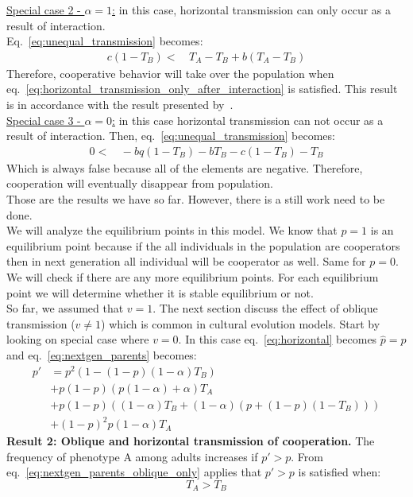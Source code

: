 \documentclass[12pt]{extarticle}
\begin{document}
\underline{Special case 2 - $\alpha =1$:} in this case, horizontal transmission can only occur as a result of interaction.
\\Eq.~\ref{eq:unequal_transmission} becomes:
\begin{equation} 
\begin{split} \label{eq:horizontal_transmission_only_after_interaction}
c(1-T_B)  < & \, T_A -T_B +b(T_A-T_B)
\end{split}
\end{equation}
Therefore, cooperative behavior will take over the population when eq.~\ref{eq:horizontal_transmission_only_after_interaction} is satisfied. 
This result is in accordance with the result presented by~\citet{lewin2017microbes}. 
\\\underline{Special case 3 - $\alpha = 0$:} in this case horizontal transmission can not occur as a result of interaction.  
Then, eq.~\ref{eq:unequal_transmission} becomes:
\begin{equation} 
\begin{split} \label{eq:horizontal_transmission_from_population}
0 < & \,  - bq(1-T_B)- bT_B-c(1-T_B)-T_B
\end {split}
\end{equation}
Which is always false because all of the elements are negative. Therefore, cooperation will eventually disappear from population.
\\Those are the results we have so far. However, there is a still work need to be done. \\
We will analyze the equilibrium points in this model. We know that $p=1$ is an equilibrium point because if the all individuals in the population are cooperators then in next generation all individual will be cooperator as well. Same for $p=0$. We will check if there are any more equilibrium points. For each equilibrium point we will determine whether it is stable equilibrium or not. 
\\So far, we assumed that $v=1$. The next section discuss the effect of oblique transmission ($v\neq 1$) which is common in cultural evolution models. 
Start by looking on special case where $v=0$. In this case eq.~\ref{eq:horizontal} becomes $\hat{p}=p$ and eq.~\ref{eq:nextgen_parents} becomes:
\begin{equation} 
\begin{split}\label{eq:nextgen_parents_oblique_only}
p' 
& = p^2 (1 - (1-p) (1-\alpha) T_B) \\
& + p(1-p)(p (1-\alpha) + \alpha) T_A \\
& + p(1-p)((1-\alpha)T_B + (1-\alpha)(p+(1-p)(1-T_B))) \\
& + (1-p)^2 p (1-\alpha) T_A
\end{split}
\end{equation}
\textbf{Result 2: Oblique and horizontal transmission of cooperation.} The frequency of phenotype A among adults increases if $p'>p$. From eq.~\ref{eq:nextgen_parents_oblique_only} applies that $p'>p$ is satisfied when:
\begin{equation} \label{eq:oblique_only_result}
T_A>T_B  
\end{equation}
\end{document}
